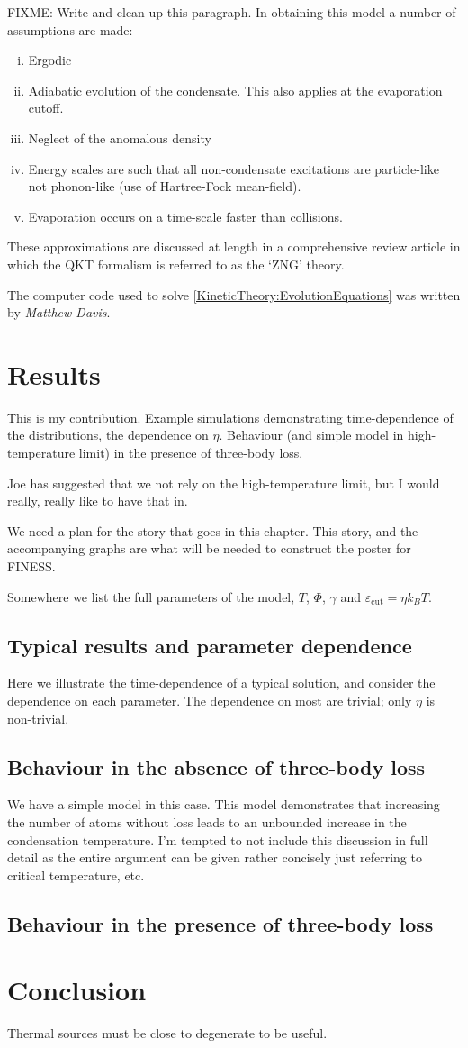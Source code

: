 FIXME: Write and clean up this paragraph. In obtaining this model a number of assumptions are made:
\begin{enumerate}[(i)]
    \item Ergodic
    \item Adiabatic evolution of the condensate. This also applies at the evaporation cutoff.
    \item Neglect of the anomalous density
    \item Energy scales are such that all non-condensate excitations are particle-like not phonon-like (use of Hartree-Fock mean-field).
    \item Evaporation occurs on a time-scale faster than collisions.
\end{enumerate}
These approximations are discussed at length in a comprehensive review article \citep{Proukakis:2008} in which the QKT formalism is referred to as the `ZNG' theory.

The computer code used to solve \eqref{KineticTheory:EvolutionEquations} was written by \emph{Matthew Davis}.

\section{Results}
\label{KineticTheory:Results}
This is my contribution. Example simulations demonstrating time-dependence of the distributions, the dependence on $\eta$. Behaviour (and simple model in high-temperature limit) in the presence of three-body loss.

Joe has suggested that we not rely on the high-temperature limit, but I would really, really like to have that in.

We need a plan for the story that goes in this chapter. This story, and the accompanying graphs are what will be needed to construct the poster for FINESS.

Somewhere we list the full parameters of the model, $T$, $\Phi$, $\gamma$ and $\varepsilon_\text{cut} = \eta k_B T$.

\subsection{Typical results and parameter dependence}
Here we illustrate the time-dependence of a typical solution, and consider the dependence on each parameter. The dependence on most are trivial; only $\eta$ is non-trivial.


\subsection{Behaviour in the absence of three-body loss}
We have a simple model in this case. This model demonstrates that increasing the number of atoms without loss leads to an unbounded increase in the condensation temperature. I'm tempted to not include this discussion in full detail as the entire argument can be given rather concisely just referring to critical temperature, etc.


\subsection{Behaviour in the presence of three-body loss}

\section{Conclusion}
Thermal sources must be close to degenerate to be useful. 